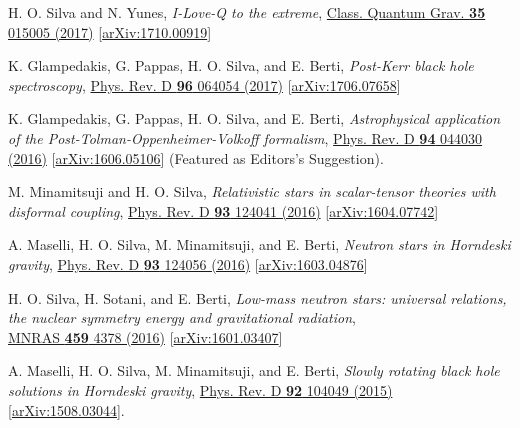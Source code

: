 \documentclass[11pt]{article}
\begin{document}
\begin{etaremune}[
        start=\value{pubCounter},
        topsep=0pt,
        partopsep=0pt]
    \item H. O. Silva and N. Yunes,
    \emph{I-Love-Q to the extreme},
    \href{http://iopscience.iop.org/article/10.1088/1361-6382/aa995a}{Class. Quantum Grav. {\bf35} 015005 (2017)}
    [\href{https://arxiv.org/abs/1710.00919}{arXiv:1710.00919}]

    \item \label{itm:postkerr}
    K. Glampedakis, G. Pappas, H. O. Silva, and E. Berti,
    \emph{Post-Kerr black hole spectroscopy},
    \href{https://journals.aps.org/prd/abstract/10.1103/PhysRevD.96.064054}{Phys. Rev. D {\bf96} 064054 (2017)}
    [\href{https://arxiv.org/abs/1706.07658}{arXiv:1706.07658}]

    \item \label{itm:astroptov}
    K. Glampedakis, G. Pappas, H. O. Silva, and E. Berti,
    \emph{Astrophysical application of the Post-Tolman-Oppenheimer-Volkoff formalism},
    \href{http://journals.aps.org/prd/abstract/10.1103/PhysRevD.94.044030}{Phys. Rev. D {\bf94} 044030 (2016)}
    [\href{https://arxiv.org/abs/1606.05106}{arXiv:1606.05106}]
    (Featured as {\color{venetianred}\sc Editors's Suggestion}).

    \item \label{itm:disformal}
    M. Minamitsuji and H. O. Silva,
    \emph{Relativistic stars in scalar-tensor theories with disformal coupling},
    \href{http://journals.aps.org/prd/abstract/10.1103/PhysRevD.93.124056}{Phys. Rev. D {\bf93} 124041 (2016)}
    [\href{https://arxiv.org/abs/1604.07742}{arXiv:1604.07742}]

    \item A. Maselli, H. O. Silva, M. Minamitsuji, and E. Berti,
    \emph{Neutron stars in Horndeski gravity},
    \href{http://journals.aps.org/prd/abstract/10.1103/PhysRevD.93.124056}{Phys. Rev. D {\bf93} 124056 (2016)}
    [\href{https://arxiv.org/abs/1603.04876}{arXiv:1603.04876}]

    \item H. O. Silva, H. Sotani, and E. Berti,
    \emph{Low-mass neutron stars: universal relations, the nuclear symmetry energy and gravitational radiation},\\
    \href{http://mnras.oxfordjournals.org/content/459/4/4378}{MNRAS {\bf459}
    4378 (2016)}
    [\href{http://arxiv.org/abs/1601.03407}{arXiv:1601.03407}]

    \item \label{itm:horndeski}
    A. Maselli, H. O. Silva, M. Minamitsuji, and E. Berti,
    \emph{Slowly rotating black hole solutions in Horndeski gravity},
    \href{http://journals.aps.org/prd/abstract/10.1103/PhysRevD.92.104049}{Phys. Rev. D {\bf92} 104049 (2015)}
    [\href{http://arxiv.org/abs/1508.03044}{arXiv:1508.03044}].


\end{etaremune}
\end{document}
